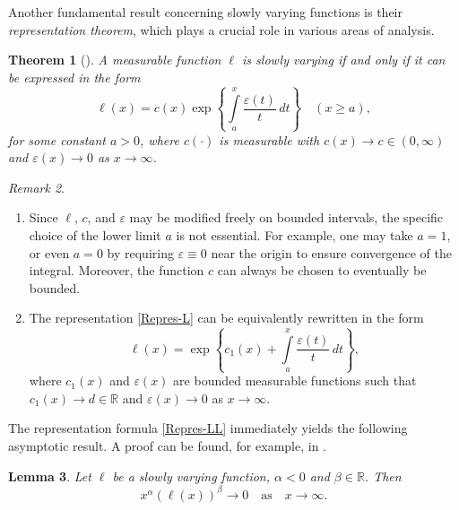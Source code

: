\documentclass[12pt,reqno]{amsart}
\theoremstyle{plain}
\newtheorem{thm}{Theorem}[section]
\newtheorem{lem}[thm]{Lemma}
\theoremstyle{definition}
\theoremstyle{remark}
\newtheorem{rem}[thm]{Remark}
\numberwithin{equation}{section}
\newcommand{\R}{\mathbb R}
\begin{document}
Another fundamental result concerning slowly varying functions is their \textit{representation theorem}, which plays a crucial role in various areas of analysis.
\begin{thm}[{\cite[Theorem 1.3.1, p. 12]{Bing-Book}}]
\label{Repres-thm}
A measurable function $\ell $ is slowly varying if and only if it can be expressed in the form
\begin{equation}
\label{Repres-L}
    \ell (x) = c(x) \exp\left\{ \int\limits_a^x \frac{\varepsilon(t)}{t} \, dt \right\} \quad (x \ge a),
\end{equation}
for some constant $a > 0$, where $c(\cdot)$ is measurable with $c(x) \to c \in (0, \infty)$ and $\varepsilon(x) \to 0$ as $x \to \infty$.
\end{thm}
\begin{rem}
\leavevmode
\rm 
\begin{enumerate}[label=(\roman*)]
\item Since $\ell $, $c$, and $\varepsilon$ may be modified freely on bounded intervals, the specific choice of the lower limit $a$ is not essential. For example, one may take $a = 1$, or even $a = 0$ by requiring $\varepsilon \equiv 0$ near the origin to ensure convergence of the integral. Moreover, the function $c$ can always be chosen to eventually be bounded.
\item The representation \eqref{Repres-L} can be equivalently rewritten in the form
\begin{equation}
\label{Repres-LL}
    \ell (x) = \exp\left\{ c_1(x) + \int\limits_a^x \frac{\varepsilon(t)}{t} \, dt \right\},
\end{equation}
where $c_1(x)$ and $\varepsilon(x)$ are bounded measurable functions such that $c_1(x) \to d \in \mathbb{R}$ and $\varepsilon(x) \to 0$ as $x \to \infty$.
\end{enumerate}
\end{rem}
The representation formula \eqref{Repres-LL} immediately yields the following asymptotic result. A proof can be found, for example, in \cite{Book-2024}.

\begin{lem}
    \label{Asympt-L}
  Let $\ell $ be a slowly varying function, $\alpha<0$ and $\beta \in\R$. Then 
  \begin{equation}
      \label{Lim-alpha-beta}
      x^{\alpha} \left(\ell (x)\right)^{\beta}\to 0\quad \text{as}\quad x\to \infty.  \end{equation}
\end{lem}
\end{document}
